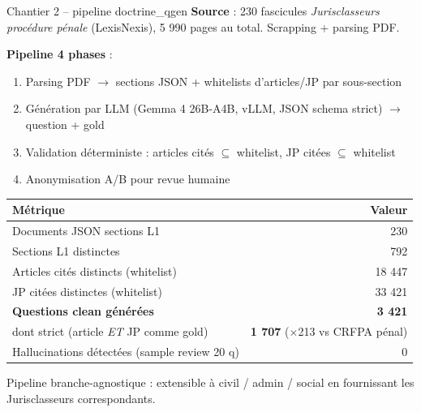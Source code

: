 \documentclass[aspectratio=169,10pt]{beamer}
\newcommand{\okbox}[1]{%
  \begin{center}
  \colorbox{green!10}{\parbox{0.92\linewidth}{\centering #1}}
  \end{center}}
\begin{document}
\begin{frame}{Chantier 2 -- pipeline doctrine\_qgen}
  \footnotesize
  \textbf{Source} : 230 fascicules \emph{Jurisclasseurs procédure pénale} (LexisNexis),
  5 990 pages au total. Scrapping + parsing PDF.

  \vspace{0.4em}
  \textbf{Pipeline 4 phases} :
  \begin{enumerate}\setlength\itemsep{0.2em}
    \item Parsing PDF $\to$ sections JSON + whitelists d'articles/JP par sous-section
    \item Génération par LLM (Gemma 4 26B-A4B, vLLM, JSON schema strict) $\to$ question + gold
    \item Validation déterministe : articles cités $\subseteq$ whitelist, JP citées $\subseteq$ whitelist
    \item Anonymisation A/B pour revue humaine
  \end{enumerate}

  \vspace{0.4em}
  \renewcommand{\arraystretch}{1.2}
  \begin{center}
  \begin{tabular}{@{}l r@{}}
    \toprule
    \textbf{Métrique} & \textbf{Valeur} \\
    \midrule
    Documents JSON sections L1                         & 230 \\
    Sections L1 distinctes                              & 792 \\
    Articles cités distincts (whitelist)                & 18 447 \\
    JP citées distinctes (whitelist)                    & 33 421 \\
    \textbf{Questions clean générées}                   & \textbf{3 421} \\
    \quad dont strict (article \emph{ET} JP comme gold) & \textbf{1 707} ($\times$213 vs CRFPA pénal) \\
    Hallucinations détectées (sample review 20 q)       & 0 \\
    \bottomrule
  \end{tabular}
  \end{center}

  \vspace{0.4em}
  \okbox{Pipeline branche-agnostique : extensible à civil / admin / social en fournissant les Jurisclasseurs correspondants.}
\end{frame}
\end{document}
